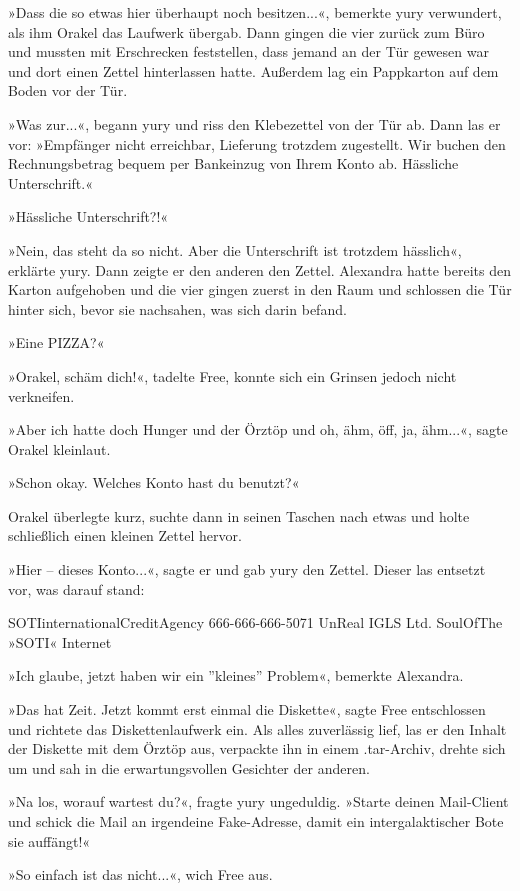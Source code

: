 »Dass die so etwas hier überhaupt noch besitzen...«, bemerkte yury verwundert, als ihm Orakel das Laufwerk übergab. Dann gingen die vier zurück zum Büro und mussten mit Erschrecken feststellen, dass jemand an der Tür gewesen war und dort einen Zettel hinterlassen hatte. Außerdem lag ein Pappkarton auf dem Boden vor der Tür.

»Was zur...«, begann yury und riss den Klebezettel von der Tür ab. Dann las er vor: »Empfänger nicht erreichbar, Lieferung trotzdem zugestellt. Wir buchen den Rechnungsbetrag bequem per Bankeinzug von Ihrem Konto ab. Hässliche Unterschrift.«

»Hässliche Unterschrift?!«

»Nein, das steht da so nicht. Aber die Unterschrift ist trotzdem hässlich«, erklärte yury. Dann zeigte er den anderen den Zettel. Alexandra hatte bereits den Karton aufgehoben und die vier gingen zuerst in den Raum und schlossen die Tür hinter sich, bevor sie nachsahen, was sich darin befand.

»Eine PIZZA?«

»Orakel, schäm dich!«, tadelte Free, konnte sich ein Grinsen jedoch nicht verkneifen.

»Aber ich hatte doch Hunger und der Örztöp und oh, ähm, öff, ja, ähm...«, sagte Orakel kleinlaut.

»Schon okay. Welches Konto hast du benutzt?«

Orakel überlegte kurz, suchte dann in seinen Taschen nach etwas und holte schließlich einen kleinen Zettel hervor.

»Hier – dieses Konto...«, sagte er und gab yury den Zettel. Dieser las entsetzt vor, was darauf stand:

 SOTIinternationalCreditAgency
 666-666-666-5071
 UnReal IGLS Ltd.
 SoulOfThe »SOTI« Internet

»Ich glaube, jetzt haben wir ein ''kleines'' Problem«, bemerkte Alexandra.

»Das hat Zeit. Jetzt kommt erst einmal die Diskette«, sagte Free entschlossen und richtete das Diskettenlaufwerk ein. Als alles zuverlässig lief, las er den Inhalt der Diskette mit dem Örztöp aus, verpackte ihn in einem .tar-Archiv, drehte sich um und sah in die erwartungsvollen Gesichter der anderen.

»Na los, worauf wartest du?«, fragte yury ungeduldig. »Starte deinen Mail-Client und schick die Mail an irgendeine Fake-Adresse, damit ein intergalaktischer Bote sie auffängt!«

»So einfach ist das nicht...«, wich Free aus.

